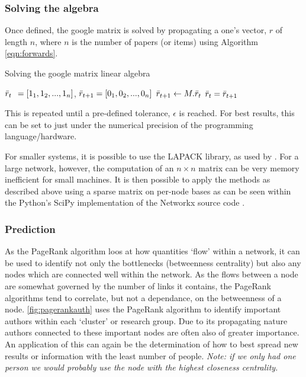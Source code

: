 \subsubsection{Solving the algebra}

Once defined, the google matrix is solved by propagating a one's vector, $r$ of length $n$, where $n$ is the number of papers (or items) using Algorithm \ref{eqn:forwards}.


\begin{algorithm} \caption{Solving the google matrix linear algebra}
\begin{algorithmic}[1]
\State  $\Bar{r}_t \:\:= [1_1, 1_2, ... , 1_n]$, $\Bar{r}_{t+1} = [0_1, 0_2, ... , 0_n]$
\State
{}
\State $\Bar{r}_{t+1} \gets M . \Bar{r}_t$
\State $\Bar{r}_t = \Bar{r}_{t+1}$
\EndWhile
\end{algorithmic}\label{eqn:forwards}
\end{algorithm}


 This is repeated until a pre-defined tolerance, $\epsilon$ is reached. For best results, this can be set to just under the numerical precision of the programming language/hardware. 


For smaller systems, it is possible to use the LAPACK \citep{lapack} library, as used by \cite{numpy}. For a large network, however, the computation of an $n \times n $ matrix can be very memory inefficient for small machines. It is then possible to apply the methods as described above using a sparse matrix on per-node bases as can be seen within the Python's SciPy implementation of the Networkx source code \citep{scipy,networkx}.

\subsubsection{Prediction}\label{sec:applypr}
As the PageRank algorithm loos at how quantities `flow' within a network, it can be used to identify not only the bottlenecks (betweenness centrality) but also any nodes which are connected well within the network. As the flows between a node are somewhat governed by the number of links it contains, the PageRank algorithms tend to correlate, but not a dependance, on the betweenness of a node. \autoref{fig:pagerankauth} uses the PageRank algorithm to identify important authors within each `cluster' or research group. Due to its propagating nature authors connected to these important nodes are often also of greater importance. An application of this can again be the determination of how to best spread new results or information with the least number of people. \textit{Note: if we only had one person we would probably use the node with the highest closeness centrality.}

